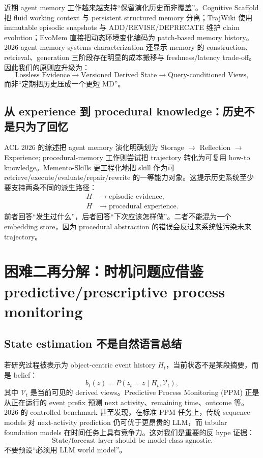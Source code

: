 \documentclass[11pt,a4paper]{ctexart}
\begin{document}
近期 agent memory 工作越来越支持“保留演化历史而非覆盖”。Cognitive Scaffold 把 fluid working context 与 persistent structured memory 分离\cite{cognitive2026scaffold}；TrajWiki 使用 immutable episodic snapshots 与 ADD/REVISE/DEPRECATE 维护 claim evolution\cite{sun2026trajwiki}；EvoMem 直接把动态环境变化编码为 patch-based memory history\cite{xu2026evoarena}。2026 agent-memory systems characterization 还显示 memory 的 construction、retrieval、generation 三阶段存在明显的成本搬移与 freshness/latency trade-off\cite{omri2026memorysystems}。因此我们的原则应升级为：
\begin{equation}
\boxed{
\text{Lossless Evidence} \to \text{Versioned Derived State} \to \text{Query-conditioned Views},
}
\end{equation}
而非“定期把历史压成一个更短 MD”。

\subsection{从 experience 到 procedural knowledge：历史不是只为了回忆}

ACL 2026 的综述把 agent memory 演化明确划为 Storage $\to$ Reflection $\to$ Experience\cite{luo2026storage}; procedural-memory 工作则尝试把 trajectory 转化为可复用 how-to knowledge\cite{cao2026procedural}。Memento-Skills 更工程化地把 skill 作为可 retrieve/execute/evaluate/repair/rewrite 的一等能力对象\cite{zhou2026memento}。这提示历史系统至少要支持两条不同的派生路径：
\begin{align}
H &\to \text{episodic evidence},\\
H &\to \text{procedural experience}.
\end{align}
前者回答“发生过什么”，后者回答“下次应该怎样做”。二者不能混为一个 embedding store，因为 procedural abstraction 的错误会反过来系统性污染未来 trajectory。

\section{困难二再分解：时机问题应借鉴 predictive/prescriptive process monitoring}

\subsection{State estimation 不是自然语言总结}

若研究过程被表示为 object-centric event history $H_t$，当前状态不是某段摘要，而是 belief：
\begin{equation}
 b_t(z)=P(z_t=z\mid H_t,\mathcal V_t),
\end{equation}
其中 $\mathcal V_t$ 是当前可见的 derived views。Predictive Process Monitoring (PPM) 正是从正在运行的 event prefix 预测 next activity、remaining time、outcome 等。2026 的 controlled benchmark 甚至发现，在标准 PPM 任务上，传统 sequence models 对 next-activity prediction 仍可优于更昂贵的 LLM，而 tabular foundation models 在时间任务上具有竞争力\cite{fertig2026ppm}。这对我们是重要的反 hype 证据：
\begin{equation}
\boxed{
\text{State/forecast layer should be model-class agnostic.}
}
\end{equation}
不要预设“必须用 LLM world model”。
\end{document}
